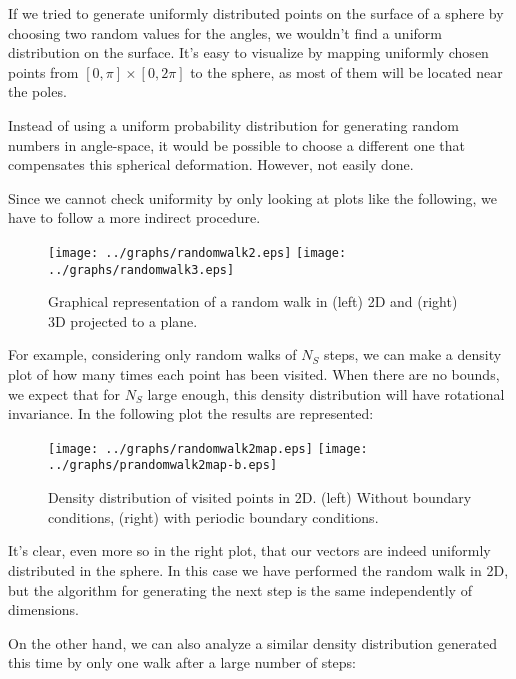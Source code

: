 \documentclass[10 pt]{article}
\begin{document}
If we tried to generate uniformly distributed points on the surface of a sphere by choosing two random values for the angles, we wouldn't find a uniform distribution on the surface. It's easy to visualize by mapping uniformly chosen points from $[0,\pi]\times[0,2\pi]$ to the sphere, as most of them will be located near the poles.

Instead of using a uniform probability distribution for generating random numbers in angle-space, it would be possible to choose a different one that compensates this spherical deformation. However, not easily done.

Since we cannot check uniformity by only looking at plots like the following, we have to follow a more indirect procedure.

\begin{figure}[H]
  \begin{center}
    \texttt{[image: ../graphs/randomwalk2.eps]}
    \texttt{[image: ../graphs/randomwalk3.eps]}
    \caption{Graphical representation of a random walk in (left) 2D and (right) 3D projected to a plane.}
  \end{center}
\end{figure}

For example, considering only random walks of $N_S$ steps, we can make a density plot of how many times each point has been visited. When there are no bounds, we expect that for $N_S$ large enough, this density distribution will have rotational invariance. In the following plot the results are represented:

\begin{figure}[H]
  \begin{center}
    \texttt{[image: ../graphs/randomwalk2map.eps]}
    \texttt{[image: ../graphs/prandomwalk2map-b.eps]}
    \caption{Density distribution of visited points in 2D. (left) Without boundary conditions, (right) with periodic boundary conditions.}
  \end{center}
\end{figure}

It's clear, even more so in the right plot, that our vectors are indeed uniformly distributed in the sphere. In this case we have performed the random walk in 2D, but the algorithm for generating the next step is the same independently of dimensions.

On the other hand, we can also analyze a similar density distribution generated this time by only one walk after a large number of steps:
\end{document}
